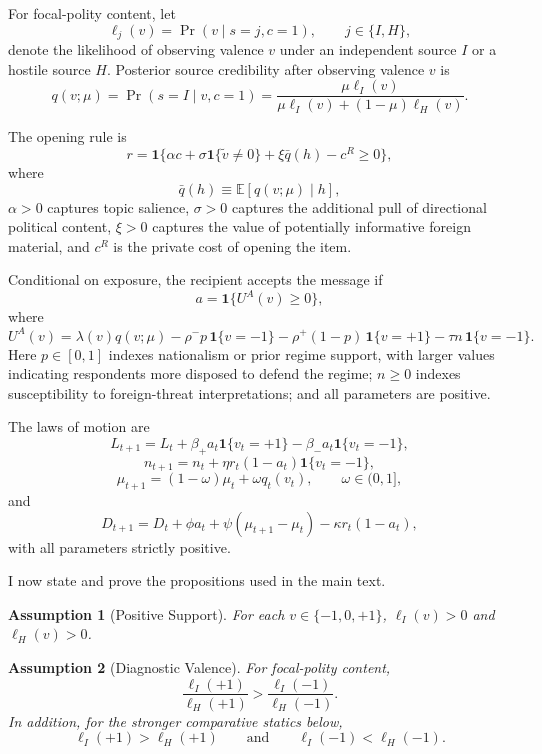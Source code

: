 \documentclass[12pt,american]{article}
\newtheorem{assumption}{Assumption}
\begin{document}
\begin{refsection}
		For focal-polity content, let
		\[
		\ell_j(v)=\Pr(v\mid s=j,c=1), \qquad j\in\{I,H\},
		\]
		denote the likelihood of observing valence \(v\) under an independent source \(I\) or a hostile source \(H\). Posterior source credibility after observing valence \(v\) is
		\[
		q(v;\mu)=\Pr(s=I\mid v,c=1)
		=\frac{\mu \ell_I(v)}{\mu \ell_I(v)+(1-\mu)\ell_H(v)}.
		\]
		
		The opening rule is
		\[
		r=\mathbf{1}\Big\{\alpha c+\sigma \mathbf{1}\{\tilde v\neq 0\}+\xi \bar q(h)-c^R\ge 0\Big\},
		\]
		where
		\[
		\bar q(h)\equiv \mathbb{E}[q(v;\mu)\mid h],
		\]
		\(\alpha>0\) captures topic salience, \(\sigma>0\) captures the additional pull of directional political content, \(\xi>0\) captures the value of potentially informative foreign material, and \(c^R\) is the private cost of opening the item.
		
		Conditional on exposure, the recipient accepts the message if
		\[
		a=\mathbf{1}\{U^A(v)\ge 0\},
		\]
		where
		\[
		U^A(v)=\lambda(v)q(v;\mu)-\rho^- p\,\mathbf{1}\{v=-1\}-\rho^+(1-p)\,\mathbf{1}\{v=+1\}-\tau n\,\mathbf{1}\{v=-1\}.
		\]
		Here \(p\in[0,1]\) indexes nationalism or prior regime support, with larger values indicating respondents more disposed to defend the regime; \(n\ge 0\) indexes susceptibility to foreign-threat interpretations; and all parameters are positive.
		
		The laws of motion are
		\[
		L_{t+1}=L_t+\beta_+ a_t\mathbf{1}\{v_t=+1\}-\beta_- a_t\mathbf{1}\{v_t=-1\},
		\]
		\[
		n_{t+1}=n_t+\eta r_t(1-a_t)\mathbf{1}\{v_t=-1\},
		\]
		\[
		\mu_{t+1}=(1-\omega)\mu_t+\omega q_t(v_t), \qquad \omega\in(0,1],
		\]
		and
		\[
		D_{t+1}=D_t+\phi a_t+\psi(\mu_{t+1}-\mu_t)-\kappa r_t(1-a_t),
		\]
		with all parameters strictly positive.
		
		I now state and prove the propositions used in the main text.
		
		\begin{assumption}[Positive Support]
			\label{ass:positive_support}
			For each \(v\in\{-1,0,+1\}\), \(\ell_I(v)>0\) and \(\ell_H(v)>0\).
		\end{assumption}
		
		\begin{assumption}[Diagnostic Valence]
			\label{ass:diagnostic_valence}
			For focal-polity content,
			\[
			\frac{\ell_I(+1)}{\ell_H(+1)}>\frac{\ell_I(-1)}{\ell_H(-1)}.
			\]
			In addition, for the stronger comparative statics below,
			\[
			\ell_I(+1)>\ell_H(+1)
			\qquad\text{and}\qquad
			\ell_I(-1)<\ell_H(-1).
			\]
		\end{assumption}
		

\end{refsection}
\end{document}
